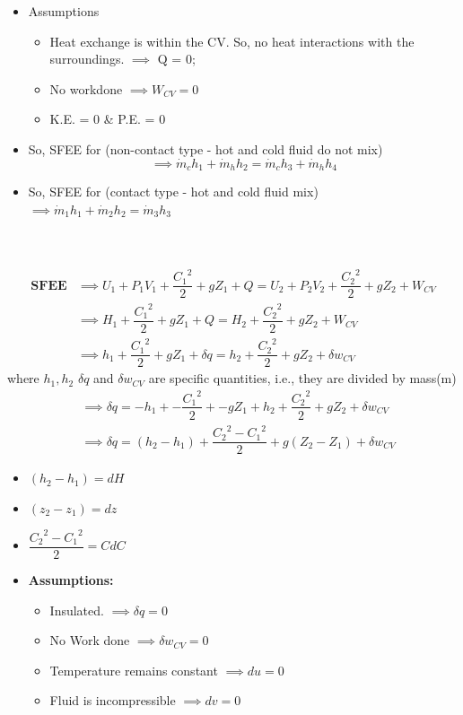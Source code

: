\documentclass[8pt]{article}
\begin{document}
	\begin{itemize}
		\item Assumptions
			\begin{itemize}
				\item Heat exchange is within the CV. So, no heat interactions with the surroundings. $\implies$ Q = 0;
				\item No workdone $\implies W_{CV} = 0$
				\item K.E. = 0 \& P.E. = 0 
			\end{itemize}
		\item So, SFEE for (non-contact type - hot and cold fluid do not mix) $$\implies \boxed{\dot{m}_ch_1 + \dot{m}_hh_2 = \dot{m}_ch_3 + \dot{m}_hh_4}$$
		\item So, SFEE for (contact type - hot and cold fluid mix) $\implies \boxed{\dot{m}_1h_1 + \dot{m}_2h_2 = \dot{m}_3h_3}$
	\end{itemize}
	\hrulefill\\
\\
\begin{align*}
		\textbf{SFEE} &\implies U_1 + P_1V_1 + \dfrac{{C_1}^2}{2} + gZ_1 + Q = U_2 + P_2V_2 + \dfrac{{C_2}^2}{2} + gZ_2 + W_{CV}\\
		&\implies H_1 + \dfrac{{C_1}^2}{2} + gZ_1 + Q = H_2 + \dfrac{{C_2}^2}{2} + gZ_2 + W_{CV}\\
		&\implies h_1 + \dfrac{{C_1}^2}{2} + gZ_1 + \delta q = h_2 + \dfrac{{C_2}^2}{2} + gZ_2 + \delta w_{CV}
\end{align*}
\hspace{2cm} where $h_1, h_2$ $\delta q$ and $\delta w_{CV}$ are specific quantities, i.e., they are divided by mass(m)
\begin{align*}
	&\implies \delta q = -h_1 + -\dfrac{{C_1}^2}{2} + -gZ_1 + h_2 + \dfrac{{C_2}^2}{2} + gZ_2 + \delta w_{CV}\\
	&\implies \delta q = (h_2-h_1) + \dfrac{{C_2}^2 - {C_1}^2}{2} + g(Z_2-Z_1) + \delta w_{CV}
\end{align*}
\begin{itemize}
	\item $(h_2-h_1)=dH$
	\item $(z_2-z_1)=dz$
	\item $\dfrac{{C_2}^2 - {C_1}^2}{2}=CdC$
	\item \textbf{Assumptions:}
		\begin{itemize}
			\item Insulated. $\implies \delta q = 0$
			\item No Work done $\implies \delta w_{CV} = 0$
			\item Temperature remains constant $\implies du = 0$
			\item Fluid is incompressible $\implies dv = 0$  
		\end{itemize}
\end{itemize}
\end{document}
